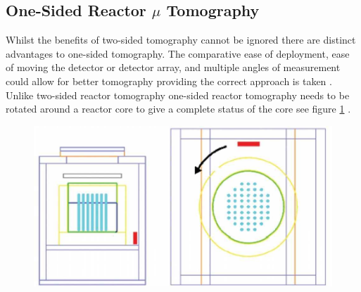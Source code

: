 \subsection{One-Sided Reactor $\mu$ Tomography}
Whilst the benefits of two-sided tomography cannot be ignored there are distinct advantages to one-sided tomography. The comparative ease of deployment, ease of moving the detector or detector array, and multiple angles of measurement could allow for better tomography providing the correct approach is taken \cite{Erlandson_reactorOST_2018}. Unlike two-sided reactor tomography one-sided reactor tomography needs to be rotated around a reactor core to give a complete status of the core see figure \ref{fig:Zed2Core1dRotation} \cite{Erlandson_reactorOST_2018}. 


\begin{figure}[!h]
 \centering
 \includegraphics[width=0.7\linewidth]{Chapter5/Figs/MuTomographyExamples/Zed2Core1dRotation.jpg}
 \label{fig:Zed2Core1dRotation}
\end{figure}

